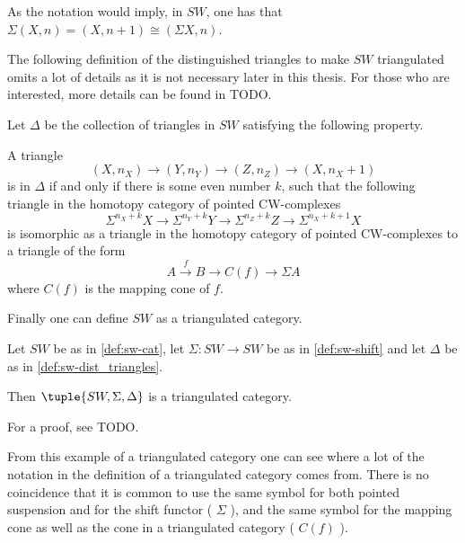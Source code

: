 As the notation would imply, in \( SW \), one has that \( \Sigma(X, n) = (X, n + 1) \cong ( \Sigma X, n ) \).

The following definition of the distinguished triangles to make \( SW \) triangulated omits a lot of details as it is not necessary later in this thesis. For those who are interested, more details can be found in TODO.

\begin{definition}
    \label{def:sw-dist_triangles}
    Let \( \Delta \) be the collection of triangles in \( SW \) satisfying the following property.

    A triangle
    \[
        (X, n_X) \to (Y, n_Y) \to (Z, n_Z) \to (X, n_X + 1)
    \]
    is in \( \Delta \) if and only if there is some even number \( k \), such that the following triangle in the homotopy category of pointed CW-complexes
    \[
        \Sigma^{n_X + k} X \to \Sigma^{n_Y + k} Y \to \Sigma^{n_Z + k} Z \to \Sigma^{n_X + k + 1} X
    \]
    is isomorphic as a triangle in the homotopy category of pointed CW-complexes to a triangle of the form
    \[
        A \stackrel{f}{\to} B \to C(f) \to \Sigma A
    \]
    where \( C(f) \) is the mapping cone of \( f \).
\end{definition}

Finally one can define \( SW \) as a triangulated category.

\begin{example}
    Let \( SW \) be as in \autoref{def:sw-cat}, let \( \Sigma: SW \to SW \) be as in \autoref{def:sw-shift} and let \( \Delta \) be as in \autoref{def:sw-dist_triangles}.

    Then \( \tuple{SW, \Sigma, \Delta} \) is a triangulated category.
\end{example}

For a proof, see TODO.

From this example of a triangulated category one can see where a lot of the notation in the definition of a triangulated category comes from. There is no coincidence that it is common to use the same symbol for both pointed suspension and for the shift functor ( \( \Sigma \) ), and the same symbol for the mapping cone as well as the cone in a triangulated category ( \( C(f) \) ).
